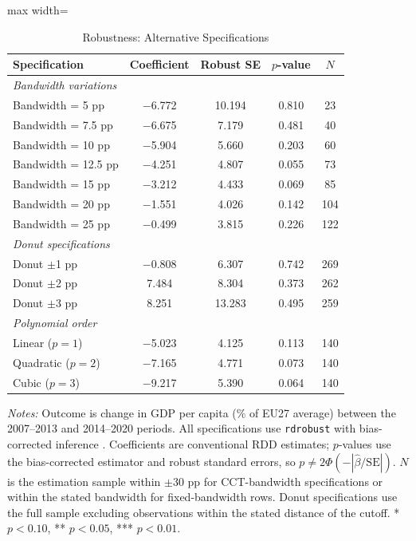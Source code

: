\documentclass[12pt]{article}
\begin{document}
\begin{table}[H]
\centering
\caption{Robustness: Alternative Specifications}
\label{tab:robustness_appendix}
\begin{threeparttable}
\begin{adjustbox}{max width=\textwidth}
\begin{tabular}{lcccc}
\toprule
Specification & Coefficient & Robust SE & $p$-value & $N$ \\
\midrule
\multicolumn{5}{l}{\textit{Bandwidth variations}} \\
Bandwidth = 5 pp & $-$6.772 & 10.194 & 0.810 & 23 \\
Bandwidth = 7.5 pp & $-$6.675 & 7.179 & 0.481 & 40 \\
Bandwidth = 10 pp & $-$5.904 & 5.660 & 0.203 & 60 \\
Bandwidth = 12.5 pp & $-$4.251 & 4.807 & 0.055 & 73 \\
Bandwidth = 15 pp & $-$3.212 & 4.433 & 0.069 & 85 \\
Bandwidth = 20 pp & $-$1.551 & 4.026 & 0.142 & 104 \\
Bandwidth = 25 pp & $-$0.499 & 3.815 & 0.226 & 122 \\[4pt]
\multicolumn{5}{l}{\textit{Donut specifications}} \\
Donut $\pm$1 pp & $-$0.808 & 6.307 & 0.742 & 269 \\
Donut $\pm$2 pp & 7.484 & 8.304 & 0.373 & 262 \\
Donut $\pm$3 pp & 8.251 & 13.283 & 0.495 & 259 \\[4pt]
\multicolumn{5}{l}{\textit{Polynomial order}} \\
Linear ($p = 1$) & $-$5.023 & 4.125 & 0.113 & 140 \\
Quadratic ($p = 2$) & $-$7.165 & 4.771 & 0.073 & 140 \\
Cubic ($p = 3$) & $-$9.217 & 5.390 & 0.064 & 140 \\
\bottomrule
\end{tabular}
\end{adjustbox}
\begin{tablenotes}[flushleft]\small
\item \textit{Notes:} Outcome is change in GDP per capita (\% of EU27 average) between the 2007--2013 and 2014--2020 periods. All specifications use \texttt{rdrobust} with bias-corrected inference \citep{CalonicoCattaneoTitiunik2014}. Coefficients are conventional RDD estimates; $p$-values use the bias-corrected estimator and robust standard errors, so $p \neq 2\Phi(-|\hat\beta/\text{SE}|)$. $N$ is the estimation sample within $\pm 30$ pp for CCT-bandwidth specifications or within the stated bandwidth for fixed-bandwidth rows. Donut specifications use the full sample excluding observations within the stated distance of the cutoff. * $p < 0.10$, ** $p < 0.05$, *** $p < 0.01$.
\end{tablenotes}
\end{threeparttable}
\end{table}
\end{document}
